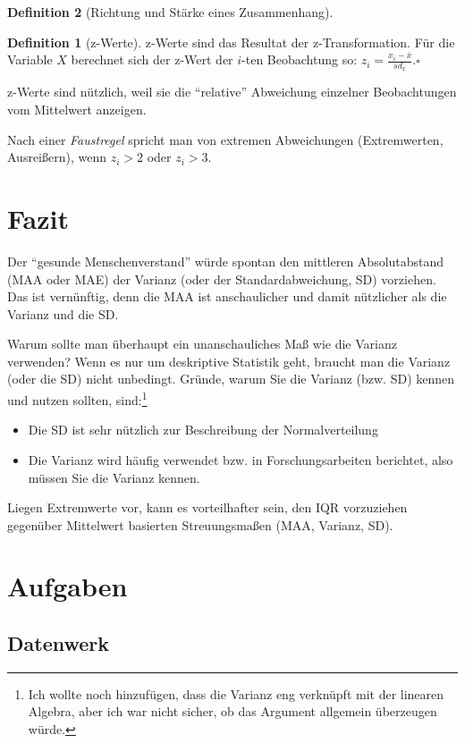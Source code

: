 \documentclass[
  a4paper,
  DIV=11]{scrreprt}
\providecommand{\tightlist}{%
  \setlength{\itemsep}{0pt}\setlength{\parskip}{0pt}}\usepackage{longtable,booktabs,array}
\theoremstyle{definition}
\theoremstyle{definition}
\theoremstyle{definition}
\newtheorem{definition}{Definition}[chapter]
\theoremstyle{remark}
\begin{document}
\begin{definition}[Richtung und Stärke eines
Zusammenhang]
\begin{definition}[z-Werte]
z-Werte sind das Resultat der z-Transformation. Für die Variable \(X\)
berechnet sich der z-Wert der \(i\)-ten Beobachtung so:
\(z_i = \frac{x_i - \bar{x}}{sd_x}.\square\)

\end{definition}

z-Werte sind nützlich, weil sie die ``relative'' Abweichung einzelner
Beobachtungen vom Mittelwert anzeigen.

Nach einer \emph{Faustregel} spricht man von extremen Abweichungen
(Extremwerten, Ausreißern), wenn \(z_i > 2\) oder \(z_i > 3\).

\section{Fazit}\label{fazit-2}

Der ``gesunde Menschenverstand'' würde spontan den mittleren
Absolutabstand (MAA oder MAE) der Varianz (oder der Standardabweichung,
SD) vorziehen. Das ist vernünftig, denn die MAA ist anschaulicher und
damit nützlicher als die Varianz und die SD.

Warum sollte man überhaupt ein unanschauliches Maß wie die Varianz
verwenden? Wenn es nur um deskriptive Statistik geht, braucht man die
Varianz (oder die SD) nicht unbedingt. Gründe, warum Sie die Varianz
(bzw. SD) kennen und nutzen sollten, sind:\footnote{Ich wollte noch
  hinzufügen, dass die Varianz eng verknüpft mit der linearen Algebra,
  aber ich war nicht sicher, ob das Argument allgemein überzeugen würde.}

\begin{itemize}
\tightlist
\item
  Die SD ist sehr nützlich zur Beschreibung der Normalverteilung
\item
  Die Varianz wird häufig verwendet bzw. in Forschungsarbeiten
  berichtet, also müssen Sie die Varianz kennen.
\end{itemize}

Liegen Extremwerte vor, kann es vorteilhafter sein, den IQR vorzuziehen
gegenüber Mittelwert basierten Streuungsmaßen (MAA, Varianz, SD).

\section{Aufgaben}\label{aufgaben-5}

\subsection{Datenwerk}\label{datenwerk}


\end{definition}
\end{document}
